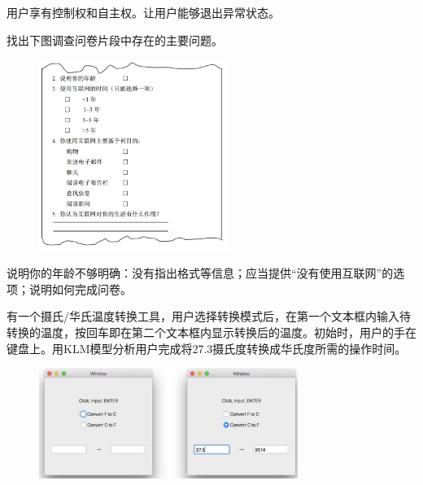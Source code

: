 \begin{solution}
用户享有控制权和自主权。让用户能够退出异常状态。
\end{solution}



\begin{problem}[2012]
找出下图调查问卷片段中存在的主要问题。

\begin{figure}[H]
    \vspace{-0.5em}
    \centering
    \includegraphics[width=0.55\textwidth]{2012问卷.png}
    \vspace{-1em}
\end{figure}
\end{problem}

\begin{solution}
说明你的年龄不够明确：没有指出格式等信息；应当提供“没有使用互联网”的选项；说明如何完成问卷。
\end{solution}



\begin{problem}[2015]
有一个摄氏/华氏温度转换工具，用户选择转换模式后，在第一个文本框内输入待转换的温度，按回车即在第二个文本框内显示转换后的温度。初始时，用户的手在键盘上。用KLM模型分析用户完成将27.3摄氏度转换成华氏度所需的操作时间。

\begin{figure}[H]
    \vspace{-0.5em}
    \centering
    \includegraphics[width=0.75\textwidth]{2015KLM.png}
    \vspace{-1em}
\end{figure}
\end{problem}
